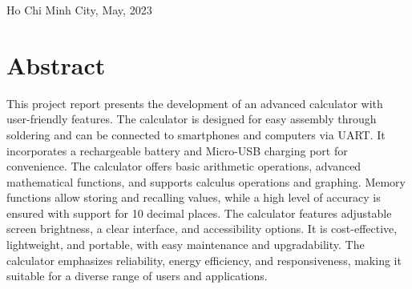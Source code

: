 \documentclass[a4paper, twoside]{report}
\begin{document}
\begin{titlepage}
\begin{otherlanguage}{vietnamese}
\end{otherlanguage}

\vspace{3.8cm}
\begin{center}
{\fontsize{13pt}{1}\selectfont Ho Chi Minh City,  May, 2023}
\end{center}
\end{titlepage}

\afterpage{\null\newpage}

\setcounter{page}{0}
\tableofcontents
\listoffigures


\chapter{Abstract}
This project report presents the development of an advanced calculator with user-friendly features. The calculator is designed for easy assembly through soldering and can be connected to smartphones and computers via UART. It incorporates a rechargeable battery and Micro-USB charging port for convenience. The calculator offers basic arithmetic operations, advanced mathematical functions, and supports calculus operations and graphing. Memory functions allow storing and recalling values, while a high level of accuracy is ensured with support for 10 decimal places. The calculator features adjustable screen brightness, a clear interface, and accessibility options. It is cost-effective, lightweight, and portable, with easy maintenance and upgradability. The calculator emphasizes reliability, energy efficiency, and responsiveness, making it suitable for a diverse range of users and applications.
\end{document}
